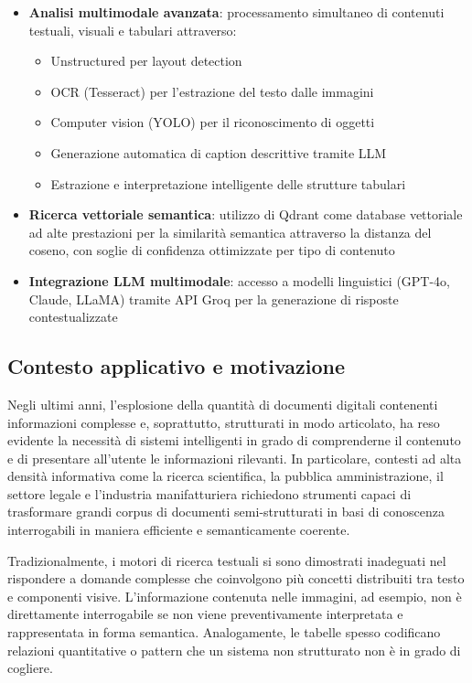 \documentclass[12pt,a4paper]{article}
\begin{document}
\begin{itemize} 
    \item \textbf{Analisi multimodale avanzata}: processamento simultaneo di contenuti testuali, visuali e tabulari attraverso: 
    \begin{itemize}
        \item Unstructured per layout detection
        \item OCR (Tesseract) per l'estrazione del testo dalle immagini
        \item Computer vision (YOLO) per il riconoscimento di oggetti
        \item Generazione automatica di caption descrittive tramite LLM
        \item Estrazione e interpretazione intelligente delle strutture tabulari
    \end{itemize} 
    \item \textbf{Ricerca vettoriale semantica}: utilizzo di Qdrant come database vettoriale ad alte prestazioni per la similarità semantica attraverso la distanza del coseno, con soglie di confidenza ottimizzate per tipo di contenuto
    \item \textbf{Integrazione LLM multimodale}: accesso a modelli linguistici (GPT-4o, Claude, LLaMA) tramite API Groq per la generazione di risposte contestualizzate
\end{itemize}

\subsection{Contesto applicativo e motivazione}
Negli ultimi anni, l'esplosione della quantità di documenti digitali contenenti informazioni complesse e, soprattutto, strutturati in modo articolato, ha reso evidente la necessità di sistemi intelligenti in grado di comprenderne il contenuto e di presentare all'utente le informazioni rilevanti. In particolare, contesti ad alta densità informativa come la ricerca scientifica, la pubblica amministrazione, il settore legale e l'industria manifatturiera richiedono strumenti capaci di trasformare grandi corpus di documenti semi-strutturati in basi di conoscenza interrogabili in maniera efficiente e semanticamente coerente.

Tradizionalmente, i motori di ricerca testuali si sono dimostrati inadeguati nel rispondere a domande complesse che coinvolgono più concetti distribuiti tra testo e componenti visive. L'informazione contenuta nelle immagini, ad esempio, non è direttamente interrogabile se non viene preventivamente interpretata e rappresentata in forma semantica. Analogamente, le tabelle spesso codificano relazioni quantitative o pattern che un sistema non strutturato non è in grado di cogliere. 
\end{document}
